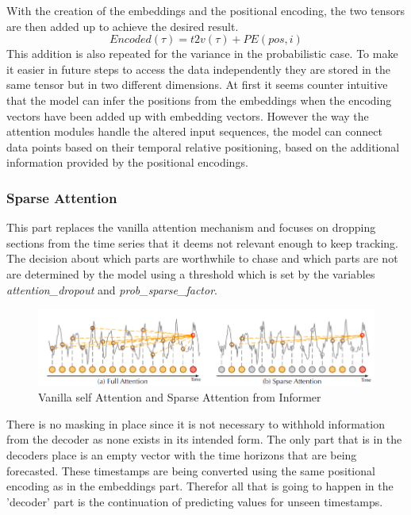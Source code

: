\documentclass{article}
\begin{document}
With the creation of the embeddings and the positional encoding, the two tensors are then added up to achieve the desired result.
\begin{equation}
    Encoded(\tau) = t2v(\tau) + PE(pos,i)
\end{equation}
This addition is also repeated for the variance in the probabilistic case. To make it easier in future steps to access the data independently they are stored in the same tensor but in two different dimensions.
At first it seems counter intuitive that the model can infer the positions from the embeddings when the encoding vectors have been added up with embedding vectors. However the way the attention modules handle the altered input sequences, the model can connect data points based on their temporal relative positioning, based on the additional information provided by the positional encodings.

\subsubsection{Sparse Attention}

This part replaces the vanilla attention mechanism and focuses on dropping sections from the time series that it deems not relevant enough to keep tracking. The decision about which parts are worthwhile to chase and which parts are not are determined by the model using a threshold which is set by the variables \textit{attention\_dropout} and \textit{prob\_sparse\_factor}.

\begin{figure}[!ht]
    \centering
    \includegraphics[width=\linewidth]{graphs/models/Sparse_Attention_Example.png}
    \caption{Vanilla self Attention and Sparse Attention from Informer}
    \label{fig:sparse_attention}
\end{figure}

There is no masking in place since it is not necessary to withhold information from the decoder as none exists in its intended form. The only part that is in the decoders place is an empty vector with the time horizons that are being forecasted. These timestamps are being converted using the same positional encoding as in the embeddings part. Therefor all that is going to happen in the 'decoder' part is the continuation of predicting values for unseen timestamps.
\end{document}
